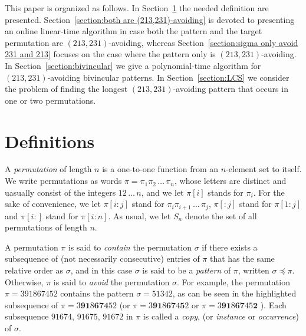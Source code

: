 \documentclass[a4paper]{llncs}
\DeclareMathOperator{\RED}{red}
\begin{document}
	This paper is organized as follows.
	In Section~\ref{section:Definitions} the needed definition are presented.
	Section~\ref{section:both are (213,231)-avoiding} is devoted to presenting
	an online linear-time algorithm in case both the pattern and the target
	permutation are $(213,231)$-avoiding,
	whereas Section~\ref{section:sigma only avoid 231 and 213} focuses on the case
	where the pattern only is $(213,231)$-avoiding.
	In Section~\ref{section:bivincular} we give a polynomial-time algorithm
	for $(213,231)$-avoiding bivincular patterns.
	In Section~\ref{section:LCS} we consider the problem of finding the longest
	$(213,231)$-avoiding pattern that occurs in one or two permutations.


\section{Definitions}
\label{section:Definitions}

A \emph{permutation} of length $n$ is a one-to-one function from an
$n$-element set to itself.
We write permutations as words
$\pi = \pi_1\pi_2\,\ldots\,\pi_n$, whose letters are distinct
and uasually consist of the integers $12\,\ldots\,n$, and we let
$\pi[i]$ stands for $\pi_i$.
For the sake of convenience, we let
$\pi[i:j]$ stand for
$\pi_i\pi_{i+1}\,\ldots\,\pi_j$,
$\pi[:j]$ stand for $\pi[1:j]$ and
$\pi[i:]$ stand for $\pi[i:n]$.
As usual, we let $S_n$ denote the set of all permutations of length $n$.


A permutation $\pi$ is said to \emph{contain} the permutation $\sigma$
if there exists a subsequence of (not necessarily consecutive)
entries of $\pi$ that has the same relative order as $\sigma$,
and in this case $\sigma$ is said to be a \emph{pattern} of
$\pi$, written $\sigma \preceq \pi$.
Otherwise, $\pi$ is said to \emph{avoid} the permutation $\sigma$.
For example, the permutation $\pi = 391867452$
contains the pattern $\sigma = 51342$,
as can be seen in the highlighted subsequence of
$\pi = 3\mathbf{9}\mathbf{1}8\mathbf{6}\mathbf{7}\mathbf{4}52$
(or
$\pi = 3\mathbf{9}\mathbf{1}8\mathbf{6}\mathbf{7}4\mathbf{5}2$
or
$\pi = 3\mathbf{9}\mathbf{1}8\mathbf{6}\mathbf{7}45\mathbf{2}$
).
Each subsequence $91674$,
$91675$,
$91672$ in $\pi$ is called a
\emph{copy},
(or \emph{instance} or \emph{occurrence}) of $\sigma$.
\end{document}
